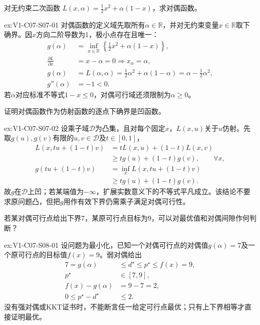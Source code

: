\begin{SLChapterExercisePairSection}
\begin{exercise}\label{ex:V1-C07-S07-01}
对无约束二次函数 $L(x,\alpha)=\tfrac12x^2+\alpha(1-x)$，求对偶函数。
\end{exercise}
\label{sol:V1-C07-S07-01}
\begin{chapterexercisesolution}{ex:V1-C07-S07-01}
对偶函数的定义域先取所有$\alpha\in\mathbb R$，并对无约束变量$x\in\mathbb R$取下确界。因$x$方向二阶导数为1，极小点存在且唯一：
\[
\begin{aligned}
g(\alpha)
&=\inf_{x\in\mathbb R}\left\{\frac12x^2+\alpha(1-x)\right\},\\
\frac{\partial L}{\partial x}&=x-\alpha=0
\Longrightarrow x_\alpha=\alpha,\\
g(\alpha)&=L(\alpha,\alpha)
=\frac12\alpha^2+\alpha(1-\alpha)
=\alpha-\frac12\alpha^2,\\
g''(\alpha)&=-1<0.
\end{aligned}
\]
若$\alpha$对应标准不等式$1-x\le0$，对偶可行域还须限制为$\alpha\ge0$。
\end{chapterexercisesolution}

\begin{exercise}\label{ex:V1-C07-S07-02}
证明对偶函数作为仿射函数的逐点下确界是凹函数。
\end{exercise}
\label{sol:V1-C07-S07-02}
\begin{chapterexercisesolution}{ex:V1-C07-S07-02}
设乘子域$\mathcal D$为凸集，且对每个固定$x$，$L(x,u)$关于$u$仿射。先取$g(u),g(v)$有限的$u,v\in\mathcal D$及$t\in[0,1]$，
\[
\begin{aligned}
L(x,tu+(1-t)v)
&=tL(x,u)+(1-t)L(x,v)\\
&\ge tg(u)+(1-t)g(v),\qquad \forall x,\\
g(tu+(1-t)v)
&=\inf_xL(x,tu+(1-t)v)\\
&\ge tg(u)+(1-t)g(v).
\end{aligned}
\]
故$g$在$\mathcal D$上凹；若某端值为$-\infty$，扩展实数意义下的不等式平凡成立。该结论不要求原问题凸，但把$g$用作有效下界仍需乘子满足对偶可行性。
\end{chapterexercisesolution}

\begin{exercise}\label{ex:V1-C07-S08-01}
若某对偶可行点给出下界7，某原可行点目标为9，可以对最优值和对偶间隙作何判断？
\end{exercise}
\label{sol:V1-C07-S08-01}
\begin{chapterexercisesolution}{ex:V1-C07-S08-01}
设问题为最小化，已知一个对偶可行点的对偶值$g(\alpha)=7$及一个原可行点的目标值$f(x)=9$。弱对偶给出
\[
\begin{aligned}
7=g(\alpha)&\le d^\star\le p^\star\le f(x)=9,\\
p^\star&\in[7,9],\\
f(x)-g(\alpha)&=9-7=2,\\
0\le p^\star-d^\star&\le2.
\end{aligned}
\]
没有强对偶或KKT证书时，不能断言任一给定可行点最优；只有上下界相等才直接证明最优。
\end{chapterexercisesolution}


\end{SLChapterExercisePairSection}
